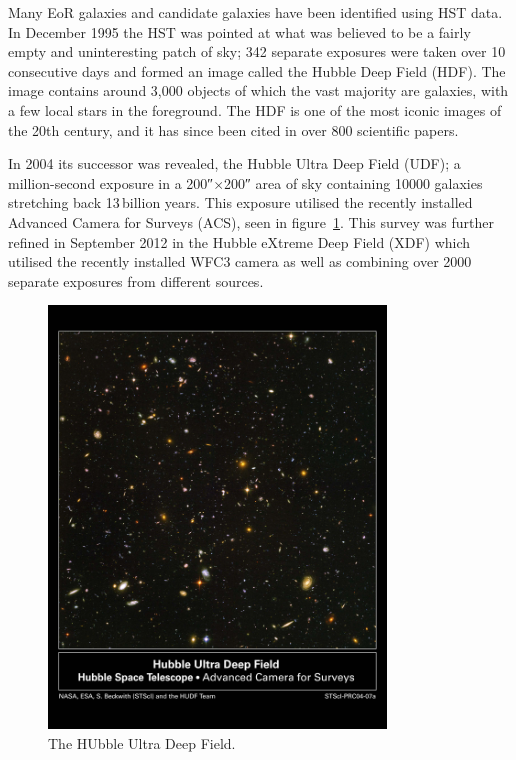 		Many EoR galaxies and candidate galaxies have been identified using HST data. In December 1995 the HST was pointed at what was believed to be a fairly empty and uninteresting patch of sky; 342 separate exposures were taken over 10 consecutive days and formed an image called the Hubble Deep Field (HDF)\cite{ESA_2}. The image contains around 3,000 objects of which the vast majority are galaxies, with a few local stars in the foreground. The HDF is one of the most iconic images of the 20th century, and it has since been cited in over 800 scientific papers.

		In 2004 its successor was revealed, the Hubble Ultra Deep Field (UDF); a million-second exposure in a 200\si{\arcsecond}$\times$200\si{\arcsecond} area of sky containing \num{10000} galaxies stretching back 13\,billion years\cite{Hubsite_2}. This exposure utilised the recently installed Advanced Camera for Surveys (ACS), seen in figure~\ref{fig:HUDF}. This survey was further refined in September 2012 in the Hubble eXtreme Deep Field (XDF) which utilised the recently installed WFC3 camera as well as combining over \num{2000} separate exposures from different sources\cite{ESA_2}.
		\begin{figure}[ht]
			\centering
			\includegraphics[width=0.8\textwidth]{../Images/HUDF.png}
			\caption{The HUbble Ultra Deep Field.\label{fig:HUDF}}
		\end{figure}

